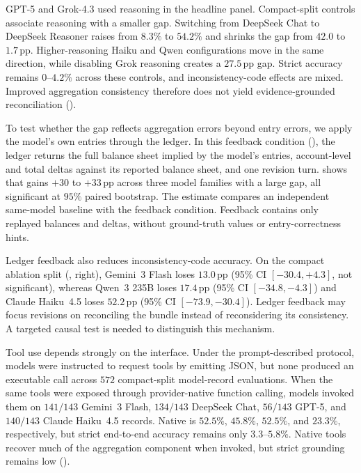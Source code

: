 GPT-5 and Grok-4.3 used reasoning in the headline panel. Compact-split controls associate reasoning with a smaller gap. Switching from DeepSeek Chat to DeepSeek Reasoner raises \bsexact{} from $8.3\%$ to $54.2\%$ and shrinks the gap from $42.0$ to $1.7$\,pp. Higher-reasoning Haiku and Qwen configurations move in the same direction, while disabling Grok reasoning creates a $27.5$\,pp gap. Strict accuracy remains $0$--$4.2\%$ across these controls, and inconsistency-code effects are mixed. Improved aggregation consistency therefore does not yield evidence-grounded reconciliation ().

To test whether the gap reflects aggregation errors beyond entry errors, we apply the model's own entries through the ledger. In this feedback condition (), the ledger returns the full balance sheet implied by the model's entries, account-level and total deltas against its reported balance sheet, and one revision turn.  shows that \bsexact{} gains $+30$ to $+33$\,pp across three model families with a large gap, all significant at $95\%$ paired bootstrap. The estimate compares an independent same-model baseline with the feedback condition. Feedback contains only replayed balances and deltas, without ground-truth values or entry-correctness hints.

Ledger feedback also reduces inconsistency-code accuracy. On the compact ablation split (, right), Gemini~3 Flash loses $13.0$\,pp (95\% CI $[-30.4,+4.3]$, not significant), whereas Qwen~3 235B loses $17.4$\,pp (95\% CI $[-34.8,-4.3]$) and Claude Haiku~4.5 loses $52.2$\,pp (95\% CI $[-73.9,-30.4]$). Ledger feedback may focus revisions on reconciling the bundle instead of reconsidering its consistency. A targeted causal test is needed to distinguish this mechanism.

Tool use depends strongly on the interface. Under the prompt-described protocol, models were instructed to request tools by emitting JSON, but none produced an executable call across $572$ compact-split model-record evaluations. When the same tools were exposed through provider-native function calling, models invoked them on $141/143$ Gemini~3 Flash, $134/143$ DeepSeek Chat, $56/143$ GPT-5, and $140/143$ Claude Haiku~4.5 records. Native \bsexact{} is $52.5\%$, $45.8\%$, $52.5\%$, and $23.3\%$, respectively, but strict end-to-end accuracy remains only $3.3$--$5.8\%$. Native tools recover much of the aggregation component when invoked, but strict grounding remains low ().

